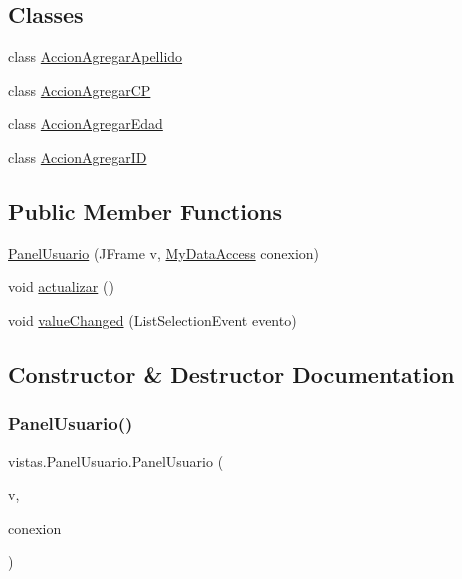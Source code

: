 \subsection*{Classes}
\begin{DoxyCompactItemize}
\item 
class \mbox{\hyperlink{classvistas_1_1_panel_usuario_1_1_accion_agregar_apellido}{Accion\+Agregar\+Apellido}}
\item 
class \mbox{\hyperlink{classvistas_1_1_panel_usuario_1_1_accion_agregar_c_p}{Accion\+Agregar\+CP}}
\item 
class \mbox{\hyperlink{classvistas_1_1_panel_usuario_1_1_accion_agregar_edad}{Accion\+Agregar\+Edad}}
\item 
class \mbox{\hyperlink{classvistas_1_1_panel_usuario_1_1_accion_agregar_i_d}{Accion\+Agregar\+ID}}
\end{DoxyCompactItemize}
\subsection*{Public Member Functions}
\begin{DoxyCompactItemize}
\item 
\mbox{\hyperlink{classvistas_1_1_panel_usuario_a21281d964400efa712d8d87864cf4d10}{Panel\+Usuario}} (J\+Frame v, \mbox{\hyperlink{classconexion_s_q_l_1_1_my_data_access}{My\+Data\+Access}} conexion)
\item 
void \mbox{\hyperlink{classvistas_1_1_panel_usuario_aa9aeb86ba4863b50f1c32ff55ce38932}{actualizar}} ()
\item 
void \mbox{\hyperlink{classvistas_1_1_panel_usuario_a5cea3757537523a738660ae7bbb41030}{value\+Changed}} (List\+Selection\+Event evento)
\end{DoxyCompactItemize}


\subsection{Constructor \& Destructor Documentation}
\mbox{\label{classvistas_1_1_panel_usuario_a21281d964400efa712d8d87864cf4d10}} 
\subsubsection{\texorpdfstring{Panel\+Usuario()}{PanelUsuario()}}
{\footnotesize\ttfamily vistas.\+Panel\+Usuario.\+Panel\+Usuario (\begin{DoxyParamCaption}\item[{J\+Frame}]{v,  }\item[{\mbox{\hyperlink{classconexion_s_q_l_1_1_my_data_access}{My\+Data\+Access}}}]{conexion }\end{DoxyParamCaption})}

